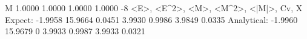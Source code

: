 M
   1.0000   1.0000
   1.0000   1.0000
-8
 <E>, <E^2>, <M>, <M^2>, <|M|>, Cv, X
Expect:
   -1.9958
   15.9664
    0.0451
    3.9930
    0.9986
   3.9849
   0.0335
Analytical:
   -1.9960
   15.9679
         0
    3.9933
    0.9987
    3.9933
    0.0321